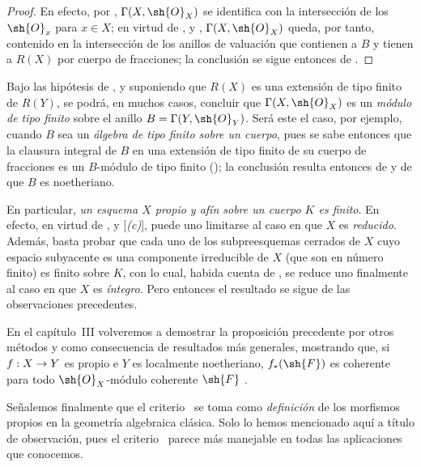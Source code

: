 \documentclass[oneside,10pt]{amsart}
\makeatletter
\newcommand{\ega@arrow}[2]{\mathchoice{#1}{#2}{#2}{#2}}
\renewcommand{\to}{\ega@arrow{\longrightarrow}{\rightarrow}}
\let\EGAOriginalLabel\label
\renewcommand{\label}[1]{\phantomsection\EGAOriginalLabel{#1}}
\makeatother
\begin{document}
\begin{proof}
En efecto, por , $\Gamma(X,\sh{O}_X)$ se identifica con la intersección de los $\sh{O}_x$ para $x\in X$;
en virtud de ,  y , $\Gamma(X,\sh{O}_X)$ queda, por tanto, contenido en la intersección de los anillos de valuación que contienen a $B$ y tienen a $R(X)$ por cuerpo de fracciones;
la conclusión se sigue entonces de .
\end{proof}

\begin{remarks}[7.3.12]
\label{II.7.3.12}
Bajo las hipótesis de , y suponiendo que $R(X)$ es una extensión de tipo finito de $R(Y)$, se podrá, en muchos casos, concluir que $\Gamma(X,\sh{O}_X)$ es un \emph{módulo de tipo finito} sobre el anillo $B=\Gamma(Y,\sh{O}_Y)$.
Será este el caso, por ejemplo, cuando $B$ sea un \emph{álgebra de tipo finito sobre un cuerpo}, pues se sabe entonces que la clausura integral de $B$ en una extensión de tipo finito de su cuerpo de fracciones es un $B$-módulo de tipo finito (\cite[t.~I, p.~267, th.~9]{I-13});
la conclusión resulta entonces de  y de que $B$ es noetheriano.

En particular, \emph{un esquema $X$ propio y afín sobre un cuerpo $K$ es finito}.
En efecto, en virtud de ,  y [\emph{(c)}], puede uno limitarse al caso en que $X$ es \emph{reducido}.
Además, basta probar que cada uno de los subpreesquemas cerrados de $X$ cuyo espacio subyacente es una componente irreducible de $X$ (que son en número finito) es finito sobre $K$, con lo cual, habida cuenta de , se reduce uno finalmente al caso en que $X$ es \emph{íntegro}.
Pero entonces el resultado se sigue de las observaciones precedentes.

En el capítulo~III volveremos a demostrar la proposición precedente por otros métodos y como consecuencia de resultados más generales, mostrando que, si $f:X\to Y$ es propio e $Y$ es localmente noetheriano, $f_*(\sh{F})$ es coherente para todo $\sh{O}_X$-módulo coherente $\sh{F}$ .

Señalemos finalmente que el criterio~ se toma como \emph{definición} de los morfismos propios en la geometría algebraica clásica.
Solo lo hemos mencionado aquí a título de observación, pues el criterio~ parece más manejable en todas las aplicaciones que conocemos.
\end{remarks}
\end{document}
